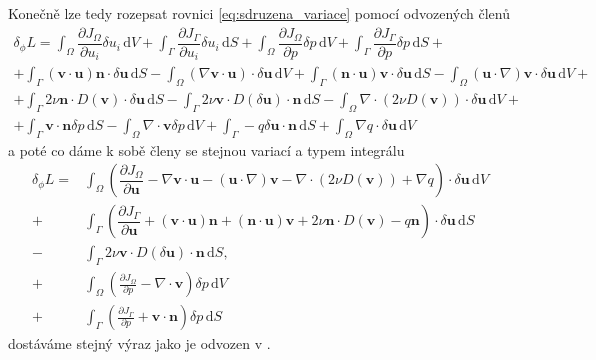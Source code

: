 Konečně lze tedy rozepsat rovnici \ref{eq:sdruzena_variace} pomocí odvozených členů
\begin{multline*}
\delta_\phi L = 
\int_{\Omega} \dfrac{\partial J_{\Omega}}{\partial u_i} \delta u_i \, \mathrm{d}V 
+ 
\int_{\Gamma} \dfrac{\partial J_{\Gamma}}{\partial u_i} \delta u_i \, \mathrm{d}S
+
\int_{\Omega} \dfrac{\partial J_{\Omega}}{\partial p} \delta p  \, \mathrm{d}V 
+ 
\int_{\Gamma} \dfrac{\partial J_{\Gamma}}{\partial p} \delta p  \, \mathrm{d}S
+\\+
\int_{\Gamma} 
(\mathbf{v}\cdot \mathbf{u} )\mathbf{n} \cdot \delta\mathbf{u}
\, \mathrm{d}S
-
\int_{\Omega} 
(\nabla \mathbf{v}\cdot \mathbf{u})\cdot\delta \mathbf{u}
\, \mathrm{d}V
+
\int_{\Gamma} 
(\mathbf{n} \cdot \mathbf{u}) \mathbf{v}\cdot \delta \mathbf{u} 
\, \mathrm{d}S
-
\int_{\Omega} 
(\mathbf{u} \cdot \nabla)\mathbf{v}\cdot \delta \mathbf{u}
\, \mathrm{d}V
+\\+
\int_{\Gamma} 
2\nu \mathbf{n} \cdot  D(\mathbf{v})\cdot \delta \mathbf{u}
\, \mathrm{d}S
- \int_{\Gamma} 
2\nu \mathbf{v} \cdot  D(\delta \mathbf{u})\cdot \mathbf{n}
\, \mathrm{d}S
-
\int_{\Omega} 
\nabla \cdot \left( 2\nu D(\mathbf{v}) \right) \cdot \delta \mathbf{u}
\, \mathrm{d}V
+\\+
\int_{\Gamma} 
\mathbf{v}\cdot \mathbf{n} \delta p 
\, \mathrm{d}S
-
\int_{\Omega} 
\nabla \cdot \mathbf{v} \delta p
\, \mathrm{d}V
+
\int_{\Gamma} 
- q \delta \mathbf{u \cdot n}
\, \mathrm{d}S
+
\int_{\Omega} 
\nabla q \cdot \delta \mathbf{u}
\, \mathrm{d}V
\end{multline*}
a poté co dáme k sobě členy se stejnou variací a typem integrálu
\begin{align*}
\delta_\phi L = 
&\int_{\Omega} 
\left(
\dfrac{\partial J_{\Omega}}{\partial \mathbf{u}}
- \nabla \mathbf{v}\cdot \mathbf{u}
- (\mathbf{u} \cdot \nabla)\mathbf{v}
- \nabla \cdot \left( 2\nu D(\mathbf{v}) \right)
+ \nabla q
\right)
\cdot \delta \mathbf{u}
\, \mathrm{d}V
\\+
&\int_{\Gamma}
\left(
\dfrac{\partial J_{\Gamma}}{\partial \mathbf{u}}
+ (\mathbf{v}\cdot \mathbf{u} )\mathbf{n} 
+ (\mathbf{n} \cdot \mathbf{u}) \mathbf{v}
+ 2\nu \mathbf{n} \cdot  D(\mathbf{v})
- q \mathbf{n}
\right)
\cdot \delta \mathbf{u}
\, \mathrm{d}S
\\-
&\int_{\Gamma} 
2\nu \mathbf{v} \cdot  D(\delta \mathbf{u})\cdot \mathbf{n}
\, \mathrm{d}S,
\\+
&\int_{\Omega} 
\left(
\frac{\partial J_\Omega}{\partial p}
- \nabla \cdot \mathbf{v}
\right)
\delta p
\, \mathrm{d}V
\\+
&\int_{\Gamma}
\left(
\frac{\partial J_\Gamma}{\partial p}
+ \mathbf{v} \cdot \mathbf{n}
\right)
 \delta p
\, \mathrm{d}S
\end{align*}
dostáváme stejný výraz jako je odvozen v \cite{othmer2008continuous}.

